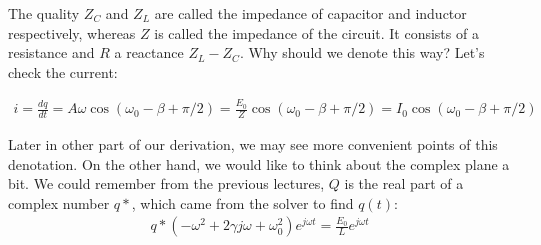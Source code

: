 The quality $Z_C$ and $Z_L$ are called the impedance of capacitor and inductor respectively, whereas $Z$ is called the impedance of the circuit. It consists of a resistance and $R$ a reactance $Z_L - Z_C$. Why should we denote this way? Let's check the current:

\begin{align}
    i = \frac{dq}{dt} = A\omega \cos(\omega_0 - \beta + \pi/2) = \frac{E_0}{Z}\cos(\omega_0 - \beta + \pi/2) = I_0\cos(\omega_0 - \beta + \pi/2)
\end{align}

Later in other part of our derivation, we may see more convenient points of this denotation. \newline
On the other hand, we would like to think about the complex plane a bit. We could remember from the previous lectures, $Q$ is the real part of a complex number $q*$, which came from the solver to find $q(t)$:
\begin{align*}
    q*\left(-\omega^{2}+2 \gamma j \omega+\omega_{0}^{2}\right) e^{j \omega t}=\frac{E_0}{L} e^{j \omega t} 
\end{align*}


